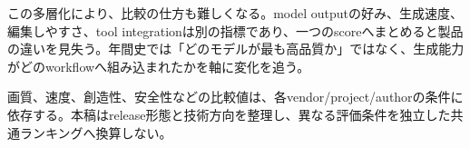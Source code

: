 この多層化により、比較の仕方も難しくなる。model outputの好み、生成速度、編集しやすさ、tool integrationは別の指標であり、一つのscoreへまとめると製品の違いを見失う。年間史では「どのモデルが最も高品質か」ではなく、生成能力がどのworkflowへ組み込まれたかを軸に変化を追う。\autocite{src-091bbe9dbf4e,src-18f22707bf78,src-2b694ab9a461,src-317afaba6510,src-9bc8e7751f80,src-9da0d929aa45,src-a4f61fbe35c5,src-ba80e5e27a11,src-e79065444906}


\begin{claimboundary}
画質、速度、創造性、安全性などの比較値は、各vendor/project/authorの条件に依存する。本稿はrelease形態と技術方向を整理し、異なる評価条件を独立した共通ランキングへ換算しない。\autocite{src-9bc8e7751f80,src-ba80e5e27a11}
\end{claimboundary}
